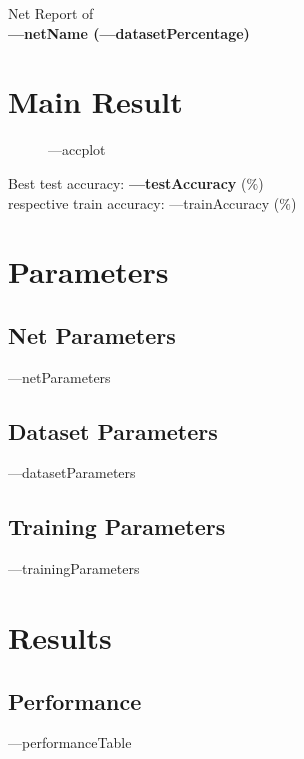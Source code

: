 \documentclass[12pt]{article}
\begin{document}
\begin{center}
    \Large{Net Report of  \\
    \textbf{---netName (---datasetPercentage)}}
\end{center}

\section{Main Result}
\begin{figure}[H]
    \centering
    ---accplot
\end{figure}
\begin{center}
    \large {Best test accuracy: \textbf{---testAccuracy} ($\%$)} \\
    \large {respective train accuracy: ---trainAccuracy ($\%$)} \\
\end{center}
\section{Parameters}
\subsection{Net Parameters}

\begin{table}[H]
    \centering
    ---netParameters
\end{table}
    
    
\subsection{Dataset Parameters}
\begin{table}[H]
    \centering
    ---datasetParameters
\end{table}

\subsection{Training Parameters}
\begin{table}[H]
    \centering
    ---trainingParameters
    \end{table}


\section{Results}
\subsection{Performance}
\begin{table}[H]
    \centering
        ---performanceTable
\end{table}
\end{document}

